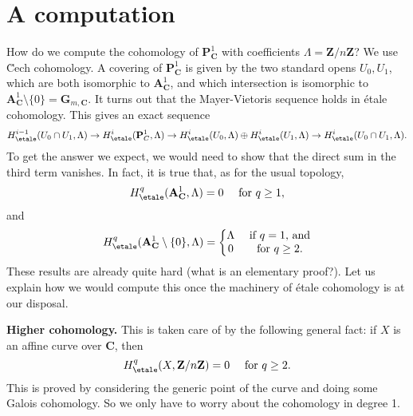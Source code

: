 \section{A computation}
\label{section-computation}

\noindent
How do we compute the cohomology of $\mathbf{P}^1_\mathbf{C}$ with coefficients
$\Lambda = \mathbf{Z}/n\mathbf{Z}$?
We use \u Cech cohomology. A covering of $\mathbf{P}^1_\mathbf{C}$ is given by
the two standard opens $U_0, U_1$, which are both
isomorphic to $\mathbf{A}^1_\mathbf{C}$, and which intersection is isomorphic
to $\mathbf{A}^1_\mathbf{C} \setminus \{0\} = \mathbf{G}_{m, \mathbf{C}}$.
It turns out that the Mayer-Vietoris sequence holds in \'etale cohomology.
This gives an exact sequence
$$
H_\etale^{i-1}(U_0\cap U_1, \Lambda) \to
H_\etale^i(\mathbf{P}^1_C, \Lambda) \to
H_\etale^i(U_0, \Lambda) \oplus
H_\etale^i(U_1, \Lambda) \to H_\etale^i(U_0\cap U_1,
\Lambda).
$$
To get the answer we expect, we would need to show that the direct sum in the
third term vanishes. In fact, it is true that, as for the usual topology,
$$
H_\etale^q (\mathbf{A}^1_\mathbf{C}, \Lambda) = 0
\quad \text{ for } q \geq 1,
$$
and
$$
H_\etale^q (\mathbf{A}^1_\mathbf{C} \setminus \{0\}, \Lambda) = \left\{
\begin{matrix}
\Lambda & \text{ if $q = 1$, and} \\
0 & \text{ for $q \geq 2$.}
\end{matrix}
\right.
$$
These results are already quite hard (what is an elementary proof?). Let us
explain how we would compute this once the machinery of \'etale cohomology is
at our disposal.

\medskip\noindent
{\bf Higher cohomology.} This is taken care of by the following general
fact: if $X$ is an affine curve over $\mathbf{C}$, then
$$
H_\etale^q (X, \mathbf{Z}/n\mathbf{Z}) = 0 \quad \text{ for } q \geq 2.
$$
This is proved by considering the generic point of the curve and doing some
Galois cohomology. So we only have to worry about the cohomology in degree 1.

